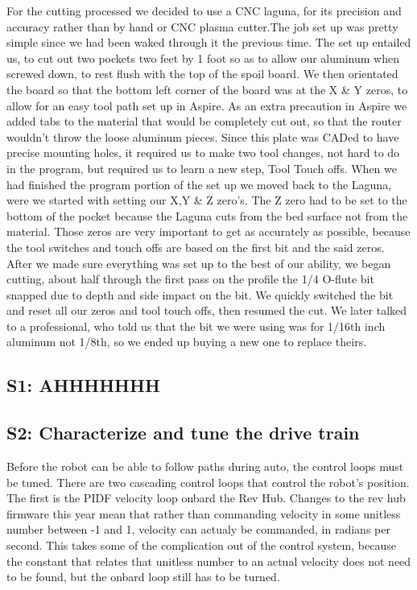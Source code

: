 \documentclass{article}
\begin{document}
For the cutting processed we decided to use a CNC laguna, for its precision and accuracy rather than by hand or CNC plasma cutter.The job set up was pretty simple since we had been waked through it the previous time. The set up entailed us, to cut out two pockets two feet by 1 foot so as to allow our aluminum when screwed down, to rest flush with the top of the spoil board. We then orientated the board so that the bottom left corner of the board was at the X \& Y zeros, to allow for an easy tool path set up in Aspire. As an extra precaution in Aspire we added tabs to the material that would be completely cut out, so that the router wouldn't throw the loose aluminum pieces. Since this plate was CADed to have precise mounting holes, it required us to make two tool changes, not hard to do in the program, but required us to learn a new step, Tool Touch offs. When we had finished the program portion of the set up we moved back to the Laguna, were we started with setting our X,Y \& Z zero's. The Z zero had to be set to the bottom of the pocket because the Laguna cuts from the bed surface not from the material. Those zeros are very important to get as accurately as possible, because the tool switches and touch offs are based on the first bit and the said zeros. After we made sure everything was set up to the best of our ability, we began cutting, about half through the first pass on the profile the 1/4 O-flute bit snapped due to depth and side impact on the bit. We quickly switched the bit and reset all our zeros and tool touch offs, then resumed the cut. We later talked to a professional, who told us that the bit we were using was for 1/16th inch aluminum not 1/8th, so we ended up buying a new one to replace theirs.  \subsection{S1: AHHHHHHH}

\subsection{S2: Characterize and tune the drive train}


Before the robot can be able to follow paths during auto, the control loops must be tuned. There are two cascading control loops that control the robot's position. The first is the PIDF velocity loop onbard the Rev Hub. Changes to the rev hub firmware this year mean that rather than commanding velocity in some unitless number between -1 and 1, velocity can actualy be commanded, in radians per second. This takes some of the complication out of the control system, because the constant that relates that unitless number to an actual velocity does not need to be found, but the onbard loop still has to be turned. 
\end{document}
